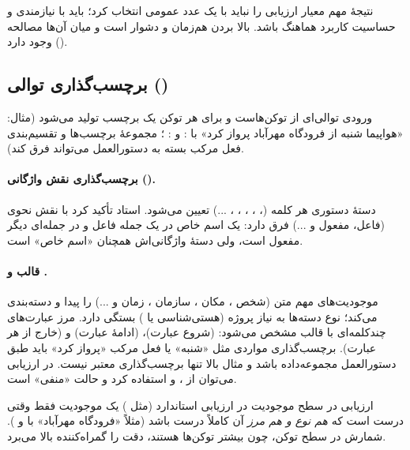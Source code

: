 \begin{exambox}{نتیجهٔ مهم}
معیار ارزیابی را نباید با یک عدد عمومی انتخاب کرد؛ باید با نیازمندی و حساسیت کاربرد هماهنگ باشد. بالا بردن هم‌زمان  و  دشوار است و میان آن‌ها مصالحه () وجود دارد.
\end{exambox}

\subsection{برچسب‌گذاری توالی ()}
ورودی توالی‌ای از توکن‌هاست و برای هر توکن یک برچسب تولید می‌شود (مثال: «هواپیما شنبه از فرودگاه مهرآباد پرواز کرد» با :  و : ؛ مجموعهٔ برچسب‌ها و تقسیم‌بندی فعل مرکب بسته به دستورالعمل می‌تواند فرق کند).



\paragraph{برچسب‌گذاری نقش واژگانی ().} دستهٔ دستوری هر کلمه (، ، ، ، ، ...) تعیین می‌شود. استاد تأکید کرد  با نقش نحوی (فاعل، مفعول و ...) فرق دارد: یک اسم خاص در یک جمله فاعل و در جمله‌ای دیگر مفعول است، ولی دستهٔ واژگانی‌اش همچنان «اسم خاص» است.

\paragraph{قالب  و .}  موجودیت‌های مهم متن (شخص ، مکان ، سازمان ، زمان و ...) را پیدا و دسته‌بندی می‌کند؛ نوع دسته‌ها به نیاز پروژه (هستی‌شناسی یا ) بستگی دارد. مرز عبارت‌های چندکلمه‌ای با قالب  مشخص می‌شود:  (شروع عبارت)،  (ادامهٔ عبارت) و  (خارج از هر عبارت). برچسب‌گذاری مواردی مثل «شنبه» یا فعل مرکب «پرواز کرد» باید طبق دستورالعمل مجموعه‌داده باشد و مثال بالا تنها برچسب‌گذاری معتبر نیست. در ارزیابی  می‌توان از ،  و  استفاده کرد و  حالت «منفی» است.

\begin{correctionbox}{ارزیابی در سطح موجودیت}
در ارزیابی استاندارد  (مثل ) یک موجودیت فقط وقتی درست است که \emph{هم نوع و هم مرز} آن کاملاً درست باشد (مثلاً «فرودگاه مهرآباد» با  و ). شمارش در سطح توکن، چون بیشتر توکن‌ها  هستند، دقت را گمراه‌کننده بالا می‌برد.
\end{correctionbox}

